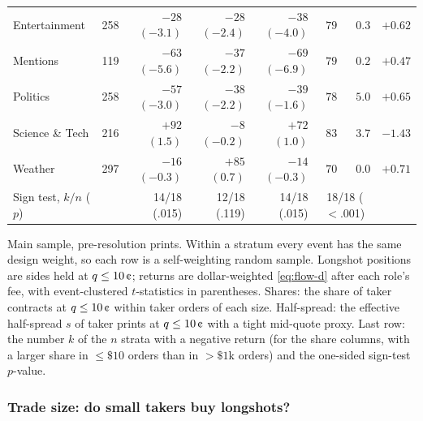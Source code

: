 \begin{table}[htbp]
\begin{threeparttable}
\begin{tabular}{@{}lrrrrrrr@{}}
\midrule
Entertainment & 258 & $-28$ $(-3.1)$ & $-28$ $(-2.4)$ & $-38$ $(-4.0)$ & $79$ & $0.3$ & $+0.62$ \\
Mentions & 119 & $-63$ $(-5.6)$ & $-37$ $(-2.2)$ & $-69$ $(-6.9)$ & $79$ & $0.2$ & $+0.47$ \\
Politics & 258 & $-57$ $(-3.0)$ & $-38$ $(-2.2)$ & $-39$ $(-1.6)$ & $78$ & $5.0$ & $+0.65$ \\
Science \& Tech & 216 & $+92$ $(1.5)$ & $-8$ $(-0.2)$ & $+72$ $(1.0)$ & $83$ & $3.7$ & $-1.43$ \\
Weather & 297 & $-16$ $(-0.3)$ & $+85$ $(0.7)$ & $-14$ $(-0.3)$ & $70$ & $0.0$ & $+0.71$ \\
\midrule
Sign test, $k/n$ ($p$) & & 14/18 (.015) & 12/18 (.119) & 14/18 (.015) & \multicolumn{2}{c}{18/18 ($<$.001)} & \\
\bottomrule
\end{tabular}
\begin{tablenotes}\footnotesize
\item Main sample, pre-resolution prints. Within a stratum every event has the same design weight, so each row is a
self-weighting random sample. Longshot positions are sides held at $\q\le10\cents$; returns are
dollar-weighted \eqref{eq:flow-d} after each role's fee, with event-clustered $t$-statistics in
parentheses. Shares: the share of taker contracts at $\q\le10\cents$ within taker orders of each size.
Half-spread: the effective half-spread $s$ of taker prints at $\q\le10\cents$ with a tight mid-quote
proxy. Last row: the number $k$ of the $n$ strata with a negative return (for the share columns,
with a larger share in $\le\$10$ orders than in $>\$1$k orders) and the one-sided sign-test
$p$-value.
\end{tablenotes}
\end{threeparttable}
\end{table}

\subsubsection{Trade size: do small takers buy longshots?}\label{sec:res-flow-size}

